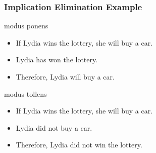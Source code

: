 \documentclass[dvipsnames]{beamer}
\begin{document}
\begin{frame}
  \frametitle{Implication Elimination Example}

  \begin{exampleblock}{modus ponens}
    \begin{itemize}
      \item If Lydia wins the lottery, she will buy a car.
      \item Lydia has won the lottery.

      \medskip
      \item Therefore, Lydia will buy a car.
    \end{itemize}
  \end{exampleblock}

  \pause
  \begin{exampleblock}{modus tollens}
    \begin{itemize}
      \item If Lydia wins the lottery, she will buy a car.
      \item Lydia did not buy a car.

      \medskip
      \item Therefore, Lydia did not win the lottery.
    \end{itemize}
  \end{exampleblock}
\end{frame}
\end{document}
